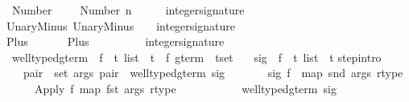 \begin{isabellebody}
\ \ Number{\isacharcolon}\ \ \ \ \ {\isachardoublequoteopen}{\isacharparenleft}Number\ n{\isacharcomma}\ \ \ {\isacharparenleft}{\isacharbrackleft}{\isacharbrackright}{\isacharcomma}\ {\isacharparenleft}{\isacharparenright}{\isacharparenright}{\isacharparenright}\ {\isasymin}\ integer{\isacharunderscore}signature{\isachardoublequoteclose}\isanewline
{\isacharbar}\ UnaryMinus{\isacharcolon}\ {\isachardoublequoteopen}{\isacharparenleft}UnaryMinus{\isacharcomma}\ {\isacharparenleft}{\isacharbrackleft}{\isacharparenleft}{\isacharparenright}{\isacharbrackright}{\isacharcomma}\ {\isacharparenleft}{\isacharparenright}{\isacharparenright}{\isacharparenright}\ {\isasymin}\ integer{\isacharunderscore}signature{\isachardoublequoteclose}\isanewline
{\isacharbar}\ Plus{\isacharcolon}\ \ \ \ \ \ \ {\isachardoublequoteopen}{\isacharparenleft}Plus{\isacharcomma}\ \ \ \ \ \ \ {\isacharparenleft}{\isacharbrackleft}{\isacharparenleft}{\isacharparenright}{\isacharcomma}{\isacharparenleft}{\isacharparenright}{\isacharbrackright}{\isacharcomma}\ {\isacharparenleft}{\isacharparenright}{\isacharparenright}{\isacharparenright}\ {\isasymin}\ integer{\isacharunderscore}signature{\isachardoublequoteclose}\isanewline
\isanewline
\isanewline
{}\isamarkupfalse%
\isanewline
\ \ well{\isacharunderscore}typed{\isacharunderscore}gterm\ {\isacharcolon}{\isacharcolon}\ {\isachardoublequoteopen}{\isacharparenleft}{\isacharprime}f\ {\isasymRightarrow}\ {\isacharprime}t\ list\ {\isacharasterisk}\ {\isacharprime}t{\isacharparenright}\ {\isasymRightarrow}\ {\isacharparenleft}{\isacharprime}f\ gterm\ {\isacharasterisk}\ {\isacharprime}t{\isacharparenright}set{\isachardoublequoteclose}\isanewline
\ \ \ sig\ {\isacharcolon}{\isacharcolon}\ {\isachardoublequoteopen}{\isacharprime}f\ {\isasymRightarrow}\ {\isacharprime}t\ list\ {\isacharasterisk}\ {\isacharprime}t{\isachardoublequoteclose}\isanewline
{}\isanewline
step{\isacharbrackleft}intro{\isacharbang}{\isacharbrackright}{\isacharcolon}\ \isanewline
\ \ \ \ {\isachardoublequoteopen}{\isasymlbrakk}{\isasymforall}pair\ {\isasymin}\ set\ args{\isachardot}\ pair\ {\isasymin}\ well{\isacharunderscore}typed{\isacharunderscore}gterm\ sig{\isacharsemicolon}\ \isanewline
\ \ \ \ \ \ sig\ f\ {\isacharequal}\ {\isacharparenleft}map\ snd\ args{\isacharcomma}\ rtype{\isacharparenright}{\isasymrbrakk}\isanewline
\ \ \ \ \ {\isasymLongrightarrow}\ {\isacharparenleft}Apply\ f\ {\isacharparenleft}map\ fst\ args{\isacharparenright}{\isacharcomma}\ rtype{\isacharparenright}\ \isanewline
\ \ \ \ \ \ \ \ \ {\isasymin}\ well{\isacharunderscore}typed{\isacharunderscore}gterm\ sig{\isachardoublequoteclose}\isanewline

\end{isabellebody}
